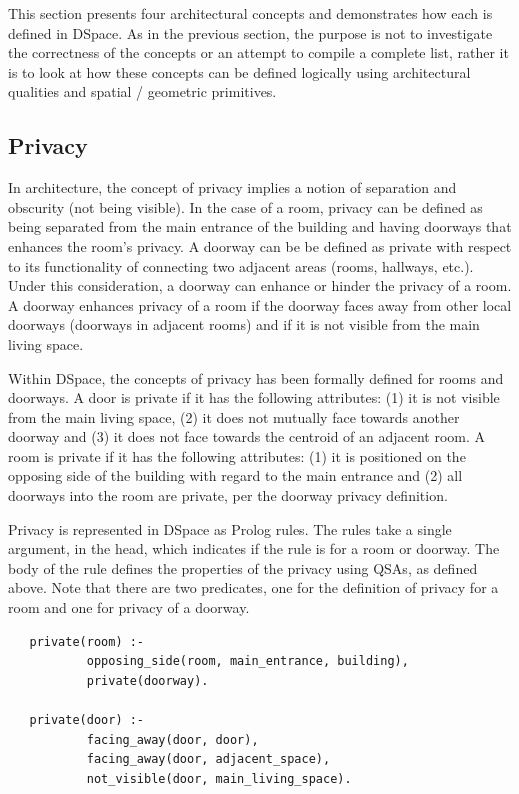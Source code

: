 \documentclass[12pt]{ucthesis}
\begin{document}
This section presents four architectural concepts and demonstrates how each is defined in DSpace. As in the previous section, the purpose is not to investigate the correctness of the concepts or an attempt to compile a complete list, rather it is to look at how these concepts can be defined logically using architectural qualities and spatial / geometric primitives.

\subsection{Privacy}
In architecture, the concept of privacy implies a notion of separation and obscurity (not being visible). In the case of a room, privacy can be defined as being separated from the main entrance of the building and having doorways that enhances the room's privacy. A doorway can be be defined as private with respect to its functionality of connecting two adjacent areas (rooms, hallways, etc.). Under this consideration, a doorway can enhance or hinder the privacy of a room. A doorway enhances privacy of a room if the doorway faces away from other local doorways (doorways in adjacent rooms) and if it is not visible from the main living space. 

Within DSpace, the concepts of privacy has been formally defined for rooms and doorways. A door is private if it has the following attributes: (1) it is not visible from the main living space, (2) it does not mutually face towards another doorway and (3) it does not face towards the centroid of an adjacent room. A room is private if it has the following attributes: (1) it is positioned on the opposing side of the building with regard to the main entrance and (2) all doorways into the room are private, per the doorway privacy definition.
 
Privacy is represented in DSpace as Prolog rules. The rules take a single argument, in the head, which indicates if the rule is for a room or doorway. The body of the rule defines the properties of the privacy using QSAs, as defined above. Note that there are two predicates, one for the definition of privacy for a room and one for privacy of a doorway.  

\begin{verbatim}
   private(room) :-  
           opposing_side(room, main_entrance, building), 
           private(doorway).
                     
   private(door) :- 
           facing_away(door, door),
           facing_away(door, adjacent_space),
           not_visible(door, main_living_space). 
\end{verbatim}
\end{document}

